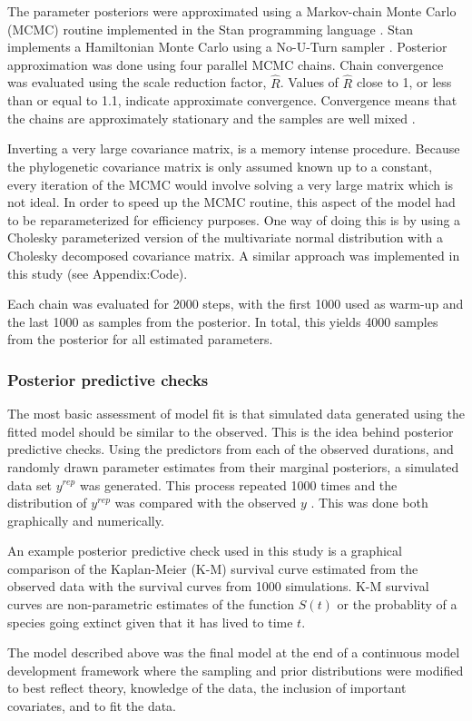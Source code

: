 \documentclass[12pt,letterpaper]{article}
\begin{document}
The parameter posteriors were approximated using a Markov-chain Monte Carlo (MCMC) routine implemented in the Stan programming language \citep{2014stan}. Stan implements a Hamiltonian Monte Carlo using a No-U-Turn sampler \citep{Hoffman-Gelman:2011}. Posterior approximation was done using four parallel MCMC chains. Chain convergence was evaluated using the scale reduction factor, \(\hat{R}\). Values of \(\hat{R}\) close to 1, or less than or equal to 1.1, indicate approximate convergence. Convergence means that the chains are approximately stationary and the samples are well mixed \citep{Gelman2013d}.

Inverting a very large covariance matrix, is a memory intense procedure. Because the phylogenetic covariance matrix is only assumed known up to a constant, every iteration of the MCMC would involve solving a very large matrix which is not ideal. In order to speed up the MCMC routine, this aspect of the model had to be reparameterized for efficiency purposes. One way of doing this is by using a Cholesky parameterized version of the multivariate normal distribution with a Cholesky decomposed covariance matrix. A similar approach was implemented in this study (see Appendix:Code).

Each chain was evaluated for 2000 steps, with the first 1000 used as warm-up and the last 1000 as samples from the posterior. In total, this yields 4000 samples from the posterior for all estimated parameters. 


\subsubsection{Posterior predictive checks}

The most basic assessment of model fit is that simulated data generated using the fitted model should be similar to the observed. This is the idea behind posterior predictive checks. Using the predictors from each of the observed durations, and randomly drawn parameter estimates from their marginal posteriors, a simulated data set \(y^{rep}\) was generated. This process repeated 1000 times and the distribution of \(y^{rep}\) was compared with the observed \(y\) \citep{Gelman2013d}. This was done both graphically and numerically.

An example posterior predictive check used in this study is a graphical comparison of the Kaplan-Meier (K-M) survival curve estimated from the observed data with the survival curves from 1000 simulations. K-M survival curves are non-parametric estimates of the function \(S(t)\) or the probablity of a species going extinct given that it has lived to time \(t\).

The model described above was the final model at the end of a continuous model development framework where the sampling and prior distributions were modified to best reflect theory, knowledge of the data, the inclusion of important covariates, and to fit the data.
\end{document}
